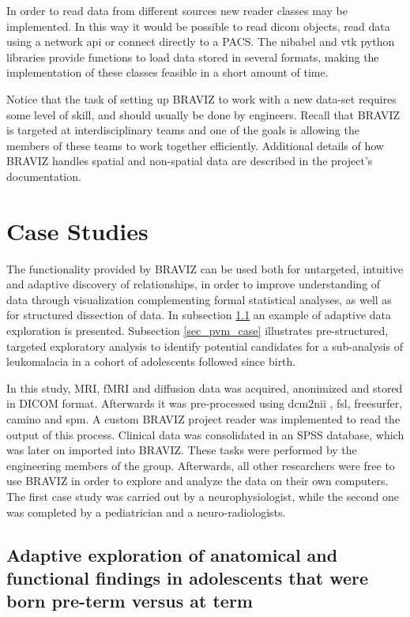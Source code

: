 \documentclass{frontiersHLTH}
\begin{document}
In order to read data from different sources new reader classes may be implemented. In this way it would be possible to read dicom objects, read data using a network api or connect directly to a PACS. The nibabel and vtk python libraries provide functions to load data stored in several formats, making the implementation of these classes feasible in a short amount of time.

Notice that the task of setting up BRAVIZ to work with a new data-set requires some level of skill, and should usually be done by engineers. Recall that BRAVIZ is targeted at interdisciplinary teams and one of the goals is allowing the members of these teams to work together efficiently. Additional details of how BRAVIZ handles spatial and non-spatial data are described in the project's documentation. 

\section{Case Studies}

The functionality provided by BRAVIZ can be used both for untargeted, intuitive and adaptive discovery of relationships, in order to improve understanding of data through visualization complementing formal statistical analyses, as well as for structured dissection of data. In subsection \ref{sec_case_cyril} an example of adaptive data exploration is presented. Subsection \ref{sec_pvm_case} illustrates pre-structured, targeted exploratory analysis to identify potential candidates for a sub-analysis of leukomalacia in a cohort of adolescents followed since birth. 

In this study, MRI, fMRI and diffusion data was acquired, anonimized and stored in DICOM format. Afterwards it was pre-processed using dcm2nii \cite{rorden_mricron_2007}, fsl\cite{jenkinson_fsl_2012}, freesurfer\cite{fischl_freesurfer_2012}, camino\cite{cook_camino:_2006} and spm\cite{friston_statistical_2007}. A custom BRAVIZ project reader was implemented to read the output of this process. 
Clinical data was consolidated in an SPSS database, which was later on imported into BRAVIZ. These tasks were performed by the engineering members of the group. Afterwards, all other researchers were free to use BRAVIZ in order to explore and analyze the data on their own computers. The first case study was carried out by a neurophysiologist, while the second one was completed by a  pediatrician and a neuro-radiologists. 

 
\subsection{Adaptive exploration of anatomical and functional findings in adolescents that were born pre-term versus at term}
\label{sec_case_cyril}
\end{document}
